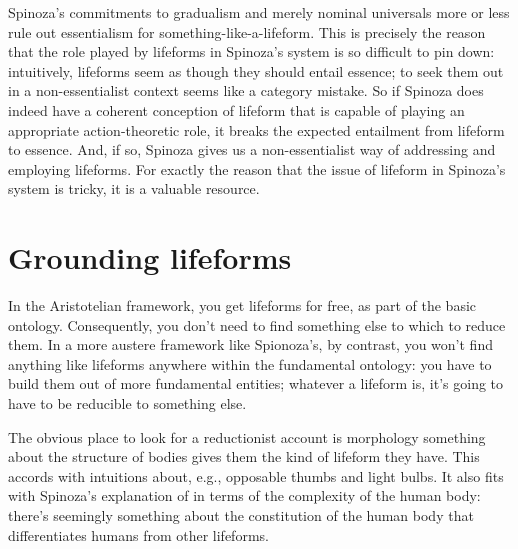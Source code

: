 \documentclass{article}
\newcommand{\dash}{\unskip{—}}
\begin{document}
Spinoza's commitments to gradualism and merely nominal universals more or less rule out essentialism for something-like-a-lifeform. This is precisely the reason that the role played by lifeforms in Spinoza's system is so difficult to pin down: intuitively, lifeforms seem as though they should entail essence; to seek them out in a non-essentialist context seems like a category mistake. So if Spinoza does indeed have a coherent conception of lifeform that is capable of playing an appropriate action-theoretic role, it breaks the expected entailment from lifeform to essence. And, if so, Spinoza gives us a non-essentialist way of addressing and employing lifeforms. For exactly the reason that the issue of lifeform in Spinoza's system is tricky, it is a valuable resource.

\section{Grounding lifeforms}\label{sec:GroundingLifeforms}

In the Aristotelian framework, you get lifeforms for free, as part of the basic ontology. Consequently, you don't need to find something else to which to reduce them. In a more austere framework like Spionoza's, by contrast, you won't find anything like lifeforms anywhere within the fundamental ontology: you have to build them out of more fundamental entities; whatever a lifeform is, it's going to have to be reducible to something else.

The obvious place to look for a reductionist account is morphology \dash something about the structure of bodies gives them the kind of lifeform they have. This accords with intuitions about, e.g., opposable thumbs and light bulbs. It also fits with Spinoza's explanation of  in terms of the complexity of the human body: there's seemingly something about the constitution of the human body that differentiates humans from other lifeforms.
\end{document}
